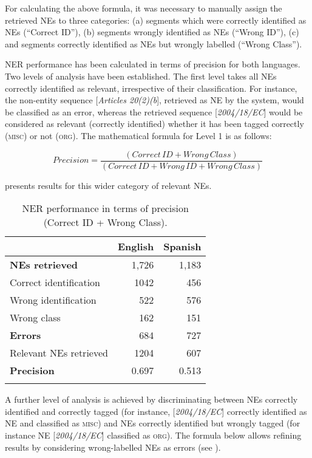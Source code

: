 \documentclass[output=paper]{langscibook}
\begin{document}
For calculating the above formula, it was necessary to manually assign the retrieved NEs to three categories: (a) segments which were correctly identified as NEs (“Correct ID”), (b) segments wrongly identified as NEs (“Wrong ID”), (c) and segments correctly identified as NEs but wrongly labelled (“Wrong Class”). 

NER performance has been calculated in terms of precision for both languages. Two levels of analysis have been established. The first level takes all NEs correctly identified as relevant, irrespective of their classification. For instance, the non-entity sequence [\textit{Articles 20(2)(b}], retrieved as NE by the system, would be classified as an error, whereas the retrieved sequence [\textit{2004/18/EC}] would be considered as relevant (correctly identified) whether it has been tagged correctly (\textsc{misc}) or not (\textsc{org}). The mathematical formula for Level 1 is as follows:

\begin{equation*}
    Precision = \frac{(Correct\,ID + Wrong\, Class)}{(Correct\,ID + Wrong\,ID + Wrong\,Class)}
\end{equation*}

 presents results for this wider category of relevant NEs.

\begin{table}
\begin{tabularx}{\textwidth}{Qrr} 
\lsptoprule
& {\bfseries English} & {\bfseries Spanish}\\
\midrule
{\bfseries NEs retrieved} & 1,726 & 1,183\\
Correct identification & 1042 & 456\\
Wrong identification & 522 & 576\\
Wrong class & 162 & 151\\
{\bfseries Errors} & 684 & 727\\
Relevant NEs retrieved & 1204 & 607\\
{\bfseries Precision} & 0.697 & 0.513\\
\lspbottomrule
\end{tabularx}
\caption{
NER performance in terms of precision (Correct ID + Wrong Class).
}
\label{tab:corpas:4}
\end{table}

A further level of analysis is achieved by discriminating between NEs correctly identified and correctly tagged (for instance, [\textit{2004/18/EC}] correctly identified as NE and classified as \textsc{misc}) and NEs correctly identified but wrongly tagged (for instance NE [\textit{2004/18/EC}] classified as \textsc{org}). The formula below allows refining results by considering wrong-labelled NEs as errors (see ).
\end{document}
